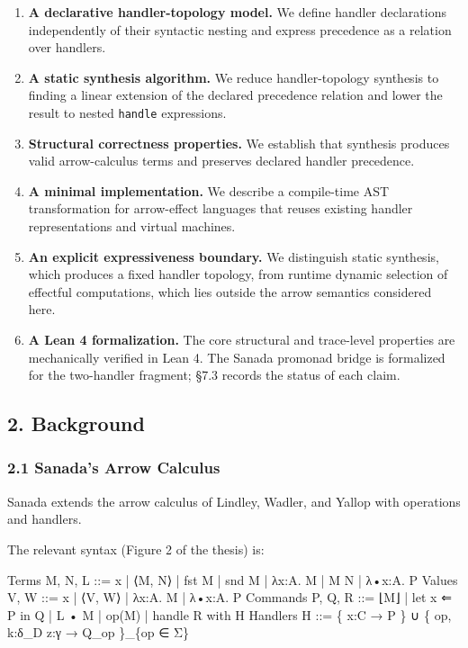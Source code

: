\documentclass[
  11pt,
]{article}
\newenvironment{Shaded}{}{}
\newcommand{\NormalTok}[1]{#1}
\providecommand{\tightlist}{%
  \setlength{\itemsep}{0pt}\setlength{\parskip}{0pt}}
\begin{document}
\begin{enumerate}
\def\labelenumi{\arabic{enumi}.}
\tightlist
\item
  \textbf{A declarative handler-topology model.} We define handler
  declarations independently of their syntactic nesting and express
  precedence as a relation over handlers.
\item
  \textbf{A static synthesis algorithm.} We reduce handler-topology
  synthesis to finding a linear extension of the declared precedence
  relation and lower the result to nested \texttt{handle} expressions.
\item
  \textbf{Structural correctness properties.} We establish that
  synthesis produces valid arrow-calculus terms and preserves declared
  handler precedence.
\item
  \textbf{A minimal implementation.} We describe a compile-time AST
  transformation for arrow-effect languages that reuses existing handler
  representations and virtual machines.
\item
  \textbf{An explicit expressiveness boundary.} We distinguish static
  synthesis, which produces a fixed handler topology, from runtime
  dynamic selection of effectful computations, which lies outside the
  arrow semantics considered here.
\item
  \textbf{A Lean 4 formalization.} The core structural and trace-level
  properties are mechanically verified in Lean 4. The Sanada promonad
  bridge is formalized for the two-handler fragment; §7.3 records the
  status of each claim.
\end{enumerate}

\subsection{2. Background}\label{background}

\subsubsection{2.1 Sanada's Arrow
Calculus}\label{sanadas-arrow-calculus}

Sanada extends the arrow calculus of Lindley, Wadler, and Yallop with
operations and handlers.

The relevant syntax (Figure 2 of the thesis) is:

\begin{Shaded}
\begin{Highlighting}[]
\NormalTok{Terms       M, N, L ::= x | ⟨M, N⟩ | fst M | snd M | λx:A. M | M N | λ•x:A. P}
\NormalTok{Values      V, W    ::= x | ⟨V, W⟩ | λx:A. M | λ•x:A. P}
\NormalTok{Commands    P, Q, R ::= ⌊M⌋ | let x ⇐ P in Q | L • M | op(M) | handle R with H}
\NormalTok{Handlers    H       ::= \{ x:C → P \} ∪ \{ op, k:δ\_D z:γ → Q\_op \}\_\{op ∈ Σ\}}
\end{Highlighting}
\end{Shaded}
\end{document}
